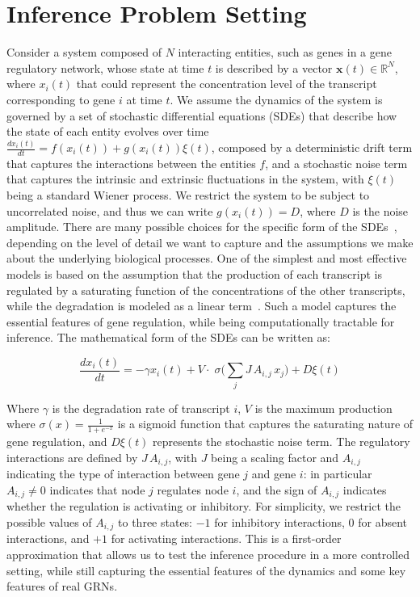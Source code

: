\documentclass[10pt, aps, rmp,  twocolumn, superscriptaddress, floatfix, showkeys]{revtex4-2}
\begin{document}
\section{Inference Problem Setting}

Consider a system composed of $N$ interacting entities, such as genes in a gene regulatory network, whose state at time $t$ is described by a vector $\mathbf{x}(t) \in \mathbb{R}^N$, where $x_i(t)$ that could represent the concentration level of the transcript corresponding to gene $i$ at time $t$. 
We assume the dynamics of the system is governed by a set of stochastic differential equations (SDEs) that describe how the state of each entity evolves over time $\frac{dx_i(t)}{dt} = f(x_i(t)) + g(x_i(t))\xi(t)$, composed by a deterministic drift term that captures the interactions between the entities $f$, and a stochastic noise term that captures the intrinsic and extrinsic fluctuations in the system, with $\xi(t)$ being a standard Wiener process. We restrict the system to be subject to uncorrelated noise, and thus we can write $g(x_i(t))=D$, where $D$ is the noise amplitude.
There are many possible choices for the specific form of the SDEs~\cite{karlebach2008modelling,vijesh2013modeling}, depending on the level of detail we want to capture and the assumptions we make about the underlying biological processes. One of the simplest and most effective models is based on the assumption that the production of each transcript is regulated by a saturating function of the concentrations of the other transcripts, while the degradation is modeled as a linear term~\cite{yu2025discover,aguirre2025gene}. Such a model captures the essential features of gene regulation, while being computationally tractable for inference. The mathematical form of the SDEs can be written as:

\begin{equation}
    \frac{dx_i(t)}{dt}=-\gamma x_i(t)+V\cdot\;\sigma\Big( \sum_j J \, A_{i,j}\,x_j\Big) + D \xi(t)
    \label{eq:ode_sigm}
\end{equation}

Where $\gamma$ is the degradation rate of transcript $i$, $V$ is the maximum production where $\sigma(x)=\frac{1}{1+e^{-x}}$ is a sigmoid function that captures the saturating nature of gene regulation, and $D \xi(t)$ represents the stochastic noise term. The regulatory interactions are defined by $J\,A_{i,j}$, with $J$ being a scaling factor and $A_{i,j}$ indicating the type of interaction between gene $j$ and gene $i$: in particular $A_{i,j}\neq 0$ indicates that node $j$ regulates node $i$, and the sign of $A_{i,j}$ indicates whether the regulation is activating or inhibitory. For simplicity, we restrict the possible values of $A_{i,j}$ to three states: $-1$ for inhibitory interactions, $0$ for absent interactions, and $+1$ for activating interactions. This is a first-order approximation that allows us to test the inference procedure in a more controlled setting, while still capturing the essential features of the dynamics and some key features of real GRNs. 
\end{document}
